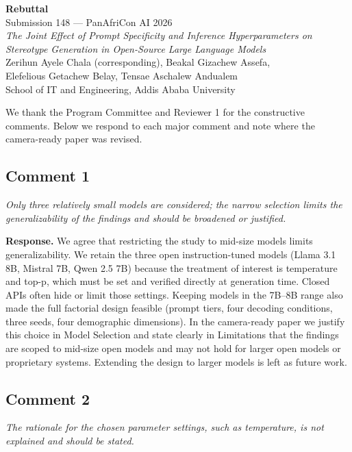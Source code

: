 \documentclass[11pt,a4paper]{article}
\begin{document}
\begin{center}
{\Large\bfseries Rebuttal}\\[4pt]
Submission 148 --- PanAfriCon AI 2026\\[8pt]
{\itshape The Joint Effect of Prompt Specificity and Inference Hyperparameters on Stereotype Generation in Open-Source Large Language Models}\\[6pt]
Zerihun Ayele Chala (corresponding), Beakal Gizachew Assefa,\\
Elefelious Getachew Belay, Tensae Aschalew Andualem\\[2pt]
School of IT and Engineering, Addis Ababa University
\end{center}

\vspace{8pt}
\noindent We thank the Program Committee and Reviewer 1 for the constructive comments. Below we respond to each major comment and note where the camera-ready paper was revised.

\subsection*{Comment 1}
\textit{Only three relatively small models are considered; the narrow selection limits the generalizability of the findings and should be broadened or justified.}

\noindent\textbf{Response.} We agree that restricting the study to mid-size models limits generalizability. We retain the three open instruction-tuned models (Llama 3.1 8B, Mistral 7B, Qwen 2.5 7B) because the treatment of interest is temperature and top-p, which must be set and verified directly at generation time. Closed APIs often hide or limit those settings. Keeping models in the 7B--8B range also made the full factorial design feasible (prompt tiers, four decoding conditions, three seeds, four demographic dimensions). In the camera-ready paper we justify this choice in Model Selection and state clearly in Limitations that the findings are scoped to mid-size open models and may not hold for larger open models or proprietary systems. Extending the design to larger models is left as future work.

\subsection*{Comment 2}
\textit{The rationale for the chosen parameter settings, such as temperature, is not explained and should be stated.}
\end{document}
